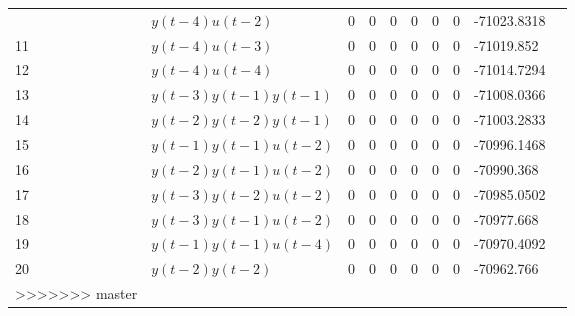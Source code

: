 \begin{tabular}{llllllllll}
\begin{tabular}{lllllllll}
10 & $y(t-4)u(t-2)$ & 0 & 0 & 0 & 0 & 0 & 0 & -71023.8318 \\ 
11 & $y(t-4)u(t-3)$ & 0 & 0 & 0 & 0 & 0 & 0 & -71019.852 \\ 
12 & $y(t-4)u(t-4)$ & 0 & 0 & 0 & 0 & 0 & 0 & -71014.7294 \\ 
13 & $y(t-3)y(t-1)y(t-1)$ & 0 & 0 & 0 & 0 & 0 & 0 & -71008.0366 \\ 
14 & $y(t-2)y(t-2)y(t-1)$ & 0 & 0 & 0 & 0 & 0 & 0 & -71003.2833 \\ 
15 & $y(t-1)y(t-1)u(t-2)$ & 0 & 0 & 0 & 0 & 0 & 0 & -70996.1468 \\ 
16 & $y(t-2)y(t-1)u(t-2)$ & 0 & 0 & 0 & 0 & 0 & 0 & -70990.368 \\ 
17 & $y(t-3)y(t-2)u(t-2)$ & 0 & 0 & 0 & 0 & 0 & 0 & -70985.0502 \\ 
18 & $y(t-3)y(t-1)u(t-2)$ & 0 & 0 & 0 & 0 & 0 & 0 & -70977.668 \\ 
19 & $y(t-1)y(t-1)u(t-4)$ & 0 & 0 & 0 & 0 & 0 & 0 & -70970.4092 \\ 
20 & $y(t-2)y(t-2)$ & 0 & 0 & 0 & 0 & 0 & 0 & -70962.766 \\ 
>>>>>>> master
\hline 
\end{tabular}